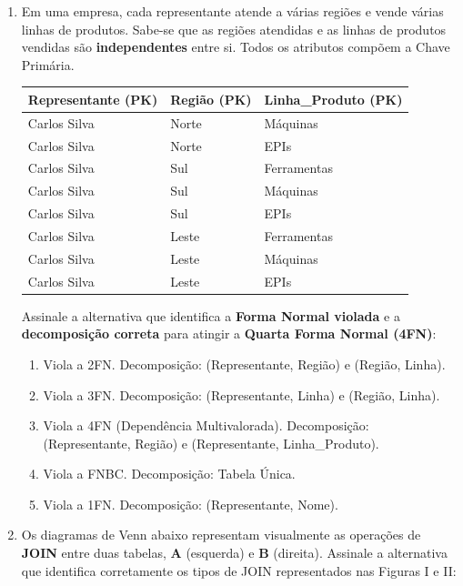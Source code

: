 \documentclass[12pt,a4paper]{article}
\begin{document}
\begin{enumerate}
    \item Em uma empresa, cada representante atende a várias regiões e vende várias linhas de produtos. Sabe-se que as regiões atendidas e as linhas de produtos vendidas são \textbf{independentes} entre si. Todos os atributos compõem a Chave Primária.
    
    \begin{center}
        \small
        \begin{tabular}{|l|l|l|}
            \hline
            \cellcolor{gray!20}\textbf{Representante (PK)} & \cellcolor{gray!20}\textbf{Região (PK)} & \cellcolor{gray!20}\textbf{Linha\_Produto (PK)} \\ \hline
            Carlos Silva & Norte & Máquinas \\ \hline
            Carlos Silva & Norte & EPIs \\ \hline
            Carlos Silva & Sul & Ferramentas \\ \hline
            Carlos Silva & Sul & Máquinas \\ \hline
            Carlos Silva & Sul & EPIs \\ \hline
            Carlos Silva & Leste & Ferramentas \\ \hline
            Carlos Silva & Leste & Máquinas \\ \hline
            Carlos Silva & Leste & EPIs \\ \hline
        \end{tabular}
    \end{center}

    Assinale a alternativa que identifica a \textbf{Forma Normal violada} e a \textbf{decomposição correta} para atingir a \textbf{Quarta Forma Normal (4FN)}:

    \begin{enumerate}[label=\Alph*)]
        \item Viola a 2FN. Decomposição: (Representante, Região) e (Região, Linha).
        \item Viola a 3FN. Decomposição: (Representante, Linha) e (Região, Linha).
        \item Viola a 4FN (Dependência Multivalorada). Decomposição: (Representante, Região) e (Representante, Linha\_Produto).
        \item Viola a FNBC. Decomposição: Tabela Única.
        \item Viola a 1FN. Decomposição: (Representante, Nome).
    \end{enumerate}

    \item Os diagramas de Venn abaixo representam visualmente as operações de \textbf{JOIN} entre duas tabelas, \textbf{A} (esquerda) e \textbf{B} (direita). Assinale a alternativa que identifica corretamente os tipos de JOIN representados nas Figuras I e II:


\end{enumerate}
\end{document}
